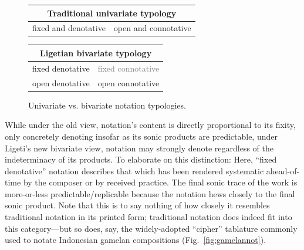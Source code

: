 \begin{figure}
    \centering
            \begin{tabular}{ |c|c| }
             \hline
             \multicolumn{2}{|c|}{\textbf{Traditional univariate typology}} \\
             \hline
             fixed and denotative & open and connotative  \\ 
             \hline
            \end{tabular}

                \vspace{10pt}

            \begin{tabular}{ |c|c| }
             \hline
             \multicolumn{2}{|c|}{\textbf{Ligetian bivariate typology}} \\
             \hline
             fixed denotative & \textcolor{gray}{fixed connotative\footnotemark}  \\ 
             \hline
             open denotative & open connotative  \\     
             \hline
            \end{tabular}
    \caption{Univariate vs. bivariate notation typologies.}
        \label{fig:typologies}
    \end{figure}

    While under the old view, notation's content is directly proportional to its fixity, only concretely denoting insofar as its sonic products are predictable, under Ligeti's new bivariate view, notation may strongly denote regardless of the indeterminacy of its products. To elaborate on this distinction: Here, ``fixed denotative'' notation describes that which has been rendered systematic ahead-of-time by the composer or by received practice. The final sonic trace of the work is more-or-less predictable/replicable because the notation hews closely to the final sonic product. Note that this is to say nothing of how closely it resembles traditional notation in its printed form; traditional notation does indeed fit into this category---but so does, say, the widely-adopted ``cipher'' tablature commonly used to notate Indonesian gamelan compositions (Fig.~\ref{fig:gamelannot}).

